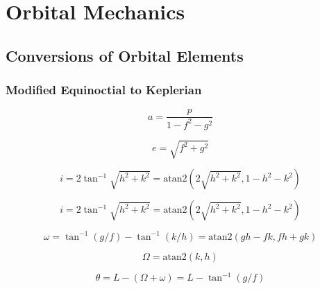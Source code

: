 \section{Orbital Mechanics}

\subsection{Conversions of Orbital Elements}

\subsubsection{Modified Equinoctial to Keplerian\label{mee2kep}}

\begin{equation}
    a = \frac{p}{1-f^2-g^2}
\end{equation}

\begin{equation}
    e = \sqrt{f^2 + g^2}
\end{equation}

\begin{equation}
    i = 2\tan^{-1}{\sqrt{h^2+k^2}}=\textrm{atan2}(2\sqrt{h^2+k^2},1-h^2-k^2)
\end{equation}

\begin{equation}
    i = 2\tan^{-1}{\sqrt{h^2+k^2}}=\textrm{atan2}(2\sqrt{h^2+k^2},1-h^2-k^2)
\end{equation}

\begin{equation}
    \omega=\tan^{-1}(g/f)-\tan^{-1}(k/h)=\textrm{atan2}(gh-fk, fh+gk)
\end{equation}

\begin{equation}
    \Omega=\textrm{atan2}(k, h)
\end{equation}

\begin{equation}
    \theta = L-(\Omega+\omega)=L-\tan^{-1}(g/f)
\end{equation}

